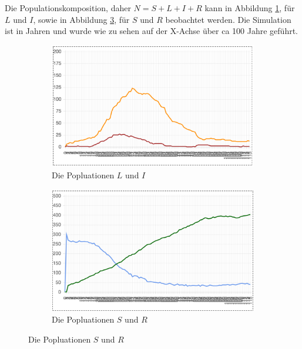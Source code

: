 \documentclass[paper=a4, fontsize=11pt, ngerman, abstract=on]{scrartcl}
\numberwithin{equation}{section} %
\numberwithin{figure}{section} %
\numberwithin{table}{section} %
\begin{document}
\newpage

Die Populationskomposition, daher $N = S + L + I + R$ kann in Abbildung \ref{fig:l-i-population}, für $L$ und $I$, sowie in Abbildung \ref{fig:s-r-population}, für $S$ und $R$ beobachtet werden. Die Simulation ist in Jahren und wurde wie zu sehen auf der X-Achse über ca 100 Jahre geführt.

\begin{figure}[ht]
  \centering
  \begin{subfigure}{.5\textwidth}
    \centering
    \includegraphics[width=.99\linewidth]{images/l-i-population}
    \caption{Die Popluationen $L$ und $I$}
    \label{fig:l-i-population}
  \end{subfigure}%
  \begin{subfigure}{.5\textwidth}
    \centering
    \includegraphics[width=.99\linewidth]{images/s-r-population}
    \caption{Die Popluationen $S$ und $R$}
    \label{fig:s-r-population}
  \end{subfigure}
\end{figure}
\end{document}
